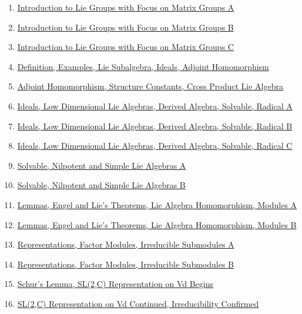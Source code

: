 \documentclass[11pt]{article}
\begin{document}
\begin{enumerate}
	\item \href{https://mp.weixin.qq.com/s/nh0NqPs8MYJ84wfVBgt58Q}{Introduction to Lie Groups with Focus on Matrix Groups A}	%
	\item \href{https://mp.weixin.qq.com/s/6V0Mt-8VZeVU_y-pO9ZeqQ}{Introduction to Lie Groups with Focus on Matrix Groups B}	%
	\item \href{https://mp.weixin.qq.com/s/24QINmbVn565Kq6LGa090Q}{Introduction to Lie Groups with Focus on Matrix Groups C}	%
	\item \href{https://mp.weixin.qq.com/s/pbaiGx1N3OD14ByaJSivZg}{Definition, Examples, Lie Subalgebra, Ideals, Adjoint Homomorphism}	%
	\item \href{https://mp.weixin.qq.com/s/dliom7PIm_jC9SdtNCv5Xg}{Adjoint Homomorphism, Structure Constants, Cross Product Lie Algebra}	%
	\item \href{https://mp.weixin.qq.com/s/6GUmjx4DJhmfqzIfyp20zg}{Ideals, Low Dimensional Lie Algebras, Derived Algebra, Solvable, Radical A}	%
	\item \href{https://mp.weixin.qq.com/s/CwpB3mqRuue119nB0ZiYfA}{Ideals, Low Dimensional Lie Algebras, Derived Algebra, Solvable, Radical B}	%
	\item \href{https://mp.weixin.qq.com/s/cOYkqoK-yIVOa1QGx1_QyA}{Ideals, Low Dimensional Lie Algebras, Derived Algebra, Solvable, Radical C}	%
	\item \href{https://mp.weixin.qq.com/s/kWQTy14QWHzLQEjNR5lACw}{Solvable, Nilpotent and Simple Lie Algebras A}	%
	\item \href{https://mp.weixin.qq.com/s/Ovzm80HWRrtfA4AMTZi47g}{Solvable, Nilpotent and Simple Lie Algebras B}	%
	\item \href{https://mp.weixin.qq.com/s/6URsB0sEjpY1xcZx5EG0cg}{Lemmas, Engel and Lie's Theorems, Lie Algebra Homomorphism, Modules A}	%
	\item \href{https://mp.weixin.qq.com/s/4aMMoYtxZyOvMDkOk4vg2w}{Lemmas, Engel and Lie's Theorems, Lie Algebra Homomorphism, Modules B}	%
	\item \href{https://mp.weixin.qq.com/s/AAbI3Ic87RzEUGBW2E4XQA}{Representations, Factor Modules, Irreducible Submodules A}	%
	\item \href{https://mp.weixin.qq.com/s/ne8v4GEsmoBGWOSGZEjuBg}{Representations, Factor Modules, Irreducible Submodules B}	%
	\item \href{https://mp.weixin.qq.com/s/rBtVRC_VPqSH5ccz8af3yg}{Schur's Lemma, SL(2,C) Representation on Vd Begins}	%
	\item \href{https://mp.weixin.qq.com/s/161Fy9zTwmgL4jrtvchLuA}{SL(2,C) Representation on Vd Continued, Irreducibility Confirmed}	%
\end{enumerate}
\end{document}
